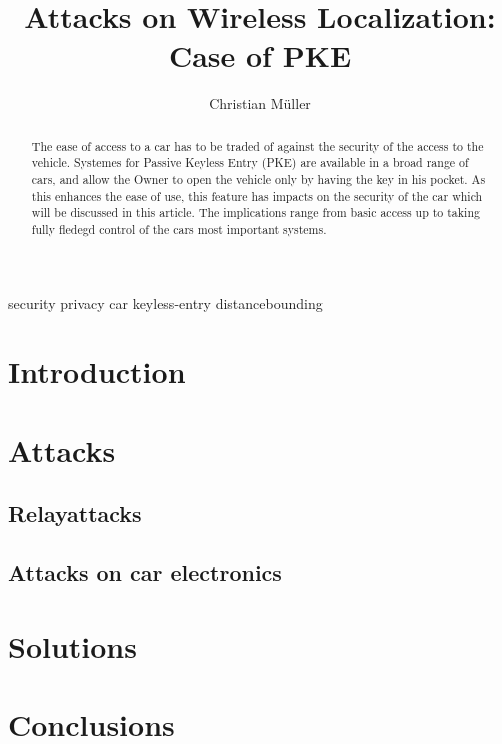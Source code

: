 \documentclass[draft,a4paper]{IEEEtran}
\title{Attacks on Wireless Localization: Case of PKE}
\author{Christian Müller}
\begin{document}
\maketitle
\begin{IEEEkeywords}
security privacy car keyless-entry distancebounding
\end{IEEEkeywords}




\begin{abstract}
The ease of access to a car has to be traded of against the security of the
access to the vehicle.
Systemes for Passive Keyless Entry (PKE) are available in a broad range of cars,
and allow the Owner to open the vehicle only by having the key in his pocket.
As this enhances the ease of use, this feature has impacts on the security of
the car which will be discussed in this article. The implications range from 
basic access up to taking fully fledegd control of the cars most important
systems.
\end{abstract}

\section{Introduction}

	

\section{Attacks}

\subsection{Relayattacks}

	

\subsection*{Attacks on car electronics}

\section{Solutions}

\section{Conclusions}
\end{document}
